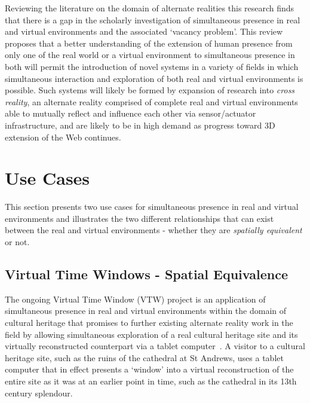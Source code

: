 

Reviewing the literature on the domain of alternate realities this research finds that there is a gap in the scholarly investigation of simultaneous presence in real and virtual environments and the associated `vacancy problem'. This review proposes that a better understanding of the extension of human presence from only one of the real world or a virtual environment to simultaneous presence in both will permit the introduction of novel systems in a variety of fields in which simultaneous interaction and exploration of both real and virtual environments is possible. Such systems will likely be formed by expansion of research into \textit{cross reality}, an alternate reality comprised of complete real and virtual environments able to mutually reflect and influence each other via sensor/actuator infrastructure, and are likely to be in high demand as progress toward 3D extension of the Web continues.

\section{Use Cases}
This section presents two use cases for simultaneous presence in real and virtual environments and illustrates the two different relationships that can exist between the real and virtual environments - whether they are \textit{spatially equivalent} or not.

\subsection{Virtual Time Windows - Spatial Equivalence}
\label{subsec:vtw}
The ongoing Virtual Time Window (VTW) project is an application of simultaneous presence in real and virtual environments within the domain of cultural heritage that promises to further existing alternate reality work in the field by allowing simultaneous exploration of a real cultural heritage site and its virtually reconstructed counterpart via a tablet computer~\cite{Davies2012}. A visitor to a cultural heritage site, such as the ruins of the cathedral at St Andrews, uses a tablet computer that in effect presents a `window' into a virtual reconstruction of the entire site as it was at an earlier point in time, such as the cathedral in its 13th century splendour.

